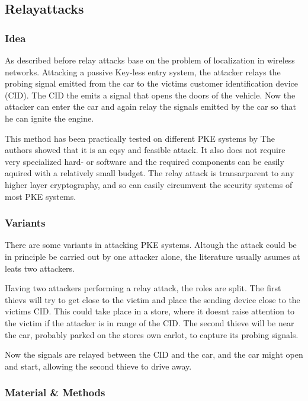
\subsection{Relayattacks}
\subsubsection*{Idea}
	As described before relay attacks base on the problem of localization in
	wireless networks.
	Attacking a passive Key-less entry system,
	the attacker relays the probing signal emitted from the car to the victims
	customer identification device (CID).
	The CID the emits a signal that opens the doors of the vehicle.
	Now the attacker can enter the car and again relay the signals emitted by the
	car so that he can ignite the engine.
	
	This method has been practically tested on different PKE systems by %
	The authors showed that it is an eqsy and feasible attack.
	It also does not require very specialized hard- or software and
	the required components can be easily aquired with a relatively small budget.
	The relay attack is transarparent to any higher layer cryptography,	%
	and so can easily circumvent the security systems of most PKE systems.

\subsubsection*{Variants}
	There are some variants in attacking PKE systems.
	Altough the attack could be in principle be carried out by one attacker alone,
	the literature usually asumes at leats two attackers.

	Having two attackers performing a relay attack,
	the roles are split.
	The first thievs will try to get close to the victim and place
	the sending device close to the victims CID.
	This could take place in a store,
	where it doesnt raise attention to the victim if the attacker
	is in range of the CID.
	The second thieve will be near the car,
	probably parked on the stores own carlot,
	to capture its probing signals.

	Now the signals are relayed between the CID and the car,
	and the car might open and start,
	allowing the second thieve to drive away.

\subsubsection*{Material \& Methods}

